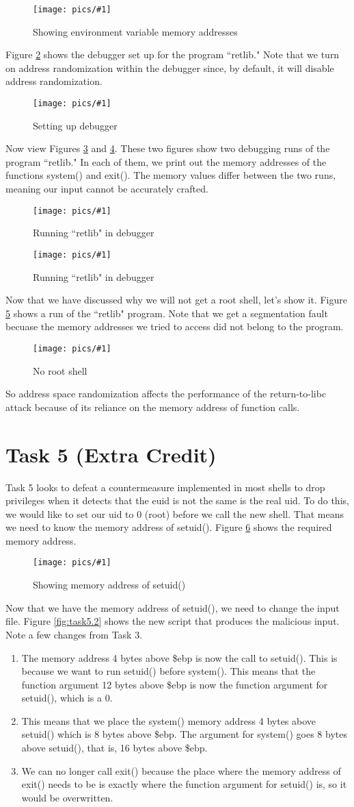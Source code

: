 \documentclass[11pt]{article}
\newcommand{\fig}[2]{ 
\begin{figure}[h]
	\centering
	\caption{#2}
	\texttt{[image: pics/\#1]}
	\label{fig:#1}
\end{figure} 
}
\begin{document}
\fig{task4.1}{Showing environment variable memory addresses}

Figure \ref{fig:task4.2} shows the debugger set up for the program ``retlib." Note that we turn on address randomization within the debugger since, by default, it will disable address randomization.

\fig{task4.2}{Setting up debugger}

\newpage
Now view Figures \ref{fig:task4.3} and \ref{fig:task4.4}. These two figures show two debugging runs of the program ``retlib." In each of them, we print out the memory addresses of the functions system() and exit(). The memory values differ between the two runs, meaning our input cannot be accurately crafted.

\fig{task4.3}{Running ``retlib" in debugger}

\fig{task4.4}{Running ``retlib" in debugger}

Now that we have discussed why we will not get a root shell, let's show it. Figure \ref{fig:task4.5} shows a run of the ``retlib" program. Note that we get a segmentation fault becuase the memory addresses we tried to access did not belong to the program.

\fig{task4.5}{No root shell}

So address space randomization affects the performance of the return-to-libc attack because of its reliance on the memory address of function calls.

\newpage

\section*{Task 5 (Extra Credit)}

Task 5 looks to defeat a countermeasure implemented in most shells to drop privileges when it detects that the euid is not the same is the real uid. To do this, we would like to set our uid to 0 (root) before we call the new shell. That means we need to know the memory address of setuid(). Figure \ref{fig:task5.1} shows the required memory address.

\fig{task5.1}{Showing memory address of setuid()}

Now that we have the memory address of setuid(), we need to change the input file. Figure \ref{fig:task5.2} shows the new script that produces the malicious input. Note a few changes from Task 3.
\begin{enumerate}
	\item The memory address 4 bytes above \$ebp is now the call to setuid(). This is because we want to run setuid() before system(). This means that the function argument 12 bytes above \$ebp is now the function argument for setuid(), which is a 0.
	\item This means that we place the system() memory address 4 bytes above setuid() which is 8 bytes above \$ebp. The argument for system() goes 8 bytes above setuid(), that is, 16 bytes above \$ebp.
	\item We can no longer call exit() because the place where the memory address of exit() needs to be is exactly where the function argument for setuid() is, so it would be overwritten.
\end{enumerate}
\end{document}
